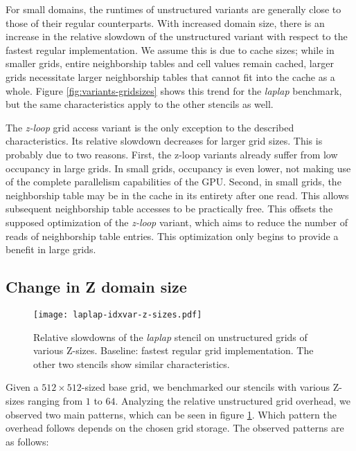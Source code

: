 For small domains, the runtimes of unstructured variants are generally close to those of their regular counterparts. With increased domain size, there is an increase in the relative slowdown of the unstructured variant with respect to the fastest regular implementation. We assume this is due to cache sizes; while in smaller grids, entire neighborship tables and cell values remain cached, larger grids necessitate larger neighborship tables that cannot fit into the cache as a whole. Figure \ref{fig:variants-gridsizes} shows this trend for the \emph{laplap} benchmark, but the same characteristics apply to the other stencils as well.

The \emph{z-loop} grid access variant is the only exception to the described characteristics. Its relative slowdown decreases for larger grid sizes. This is probably due to two reasons. First, the z-loop variants already suffer from low occupancy in large grids. In small grids, occupancy is even lower, not making use of the complete parallelism capabilities of the GPU. Second, in small grids, the neighborship table may be in the cache in its entirety after one read. This allows subsequent neighborship table accesses to be practically free. This offsets the supposed optimization of the \emph{z-loop} variant, which aims to reduce the number of reads of neighborship table entries. This optimization only begins to provide a benefit in large grids.

\subsection{Change in Z domain size}
\label{sec:res-z-size-change}

\begin{figure}
	\begin{center}
    \texttt{[image: laplap-idxvar-z-sizes.pdf]}
	\end{center}
    \caption{\label{fig:laplap-z-sizes} Relative slowdowns of the \emph{laplap} stencil on unstructured grids of various Z-sizes. Baseline: fastest regular grid implementation. The other two stencils show similar characteristics.}
\end{figure}

Given a $512\times 512$-sized base grid, we benchmarked our stencils with various Z-sizes ranging from $1$ to $64$. Analyzing the relative unstructured grid overhead, we observed two main patterns, which can be seen in figure \ref{fig:laplap-z-sizes}. Which pattern the overhead follows depends on the chosen grid storage. The observed patterns are as follows:

